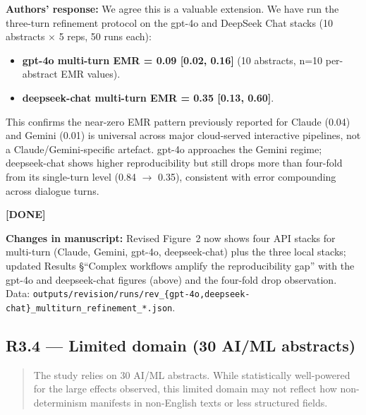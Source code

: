 \documentclass[11pt,a4paper]{article}
\newenvironment{revquote}{%
  \begin{quote}\small\itshape\color{revgray}
}{%
  \end{quote}
}
\newcommand{\response}[1]{\par\noindent\textbf{\color{revgreen}Authors' response:} #1\par}
\newcommand{\changes}[1]{\par\noindent\textbf{\color{revblue}Changes in manuscript:} #1\par}
\newcommand{\done}{\color{revgreen}\textbf{[DONE]}}
\begin{document}
\response{We agree this is a valuable extension. We have run the three-turn refinement protocol on the gpt-4o and DeepSeek Chat stacks (10 abstracts $\times$ 5 reps, 50 runs each):

\begin{itemize}[leftmargin=*]
  \item \textbf{gpt-4o multi-turn EMR = 0.09 [0.02, 0.16]} (10 abstracts, n=10 per-abstract EMR values).
  \item \textbf{deepseek-chat multi-turn EMR = 0.35 [0.13, 0.60]}.
\end{itemize}

This confirms the near-zero EMR pattern previously reported for Claude (0.04) and Gemini (0.01) is universal across major cloud-served interactive pipelines, not a Claude/Gemini-specific artefact. gpt-4o approaches the Gemini regime; deepseek-chat shows higher reproducibility but still drops more than four-fold from its single-turn level (0.84 $\rightarrow$ 0.35), consistent with error compounding across dialogue turns.} \done

\changes{Revised Figure~2 now shows four API stacks for multi-turn (Claude, Gemini, gpt-4o, deepseek-chat) plus the three local stacks; updated Results §``Complex workflows amplify the reproducibility gap'' with the gpt-4o and deepseek-chat figures (above) and the four-fold drop observation. Data: \texttt{outputs/revision/runs/rev\_\{gpt-4o,deepseek-chat\}\_multiturn\_refinement\_*.json}.}

\subsection*{R3.4 --- Limited domain (30 AI/ML abstracts)}

\begin{revquote}
The study relies on 30 AI/ML abstracts. While statistically well-powered for the large effects observed, this limited domain may not reflect how non-determinism manifests in non-English texts or less structured fields.
\end{revquote}
\end{document}
